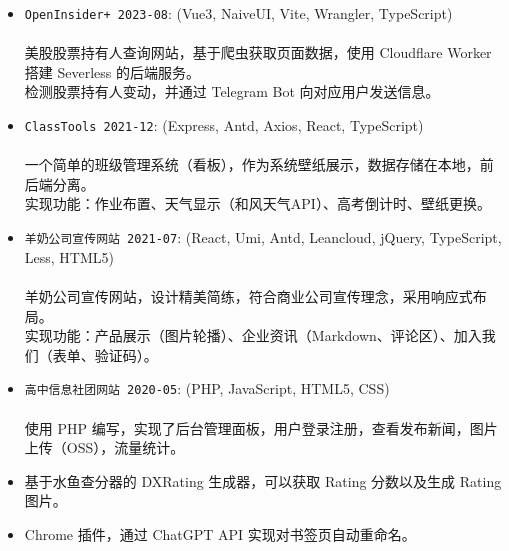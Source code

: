 \documentclass[zh]{resume}
\begin{document}
\begin{itemize}
  \item \texttt{OpenInsider+ 2023-08}:
    (Vue3, NaiveUI, Vite, Wrangler, TypeScript)\\
    \\
    美股股票持有人查询网站，基于爬虫获取页面数据，使用 Cloudflare Worker 搭建 Severless 的后端服务。\\
    检测股票持有人变动，并通过 Telegram Bot 向对应用户发送信息。
  \item \texttt{ClassTools 2021-12}:
    (Express, Antd, Axios, React, TypeScript)\\
    \\
    一个简单的班级管理系统（看板），作为系统壁纸展示，数据存储在本地，前后端分离。\\
    实现功能：作业布置、天气显示（和风天气API）、高考倒计时、壁纸更换。
  \item \texttt{羊奶公司宣传网站 2021-07}:
    (React, Umi, Antd, Leancloud, jQuery, TypeScript, Less, HTML5)\\
    \\
    羊奶公司宣传网站，设计精美简练，符合商业公司宣传理念，采用响应式布局。\\
    实现功能：产品展示（图片轮播）、企业资讯（Markdown、评论区）、加入我们（表单、验证码）。
  \item {\texttt{高中信息社团网站 2020-05}}:
    (PHP, JavaScript, HTML5, CSS)\\
    \\
    使用 PHP 编写，实现了后台管理面板，用户登录注册，查看发布新闻，图片上传（OSS），流量统计。
\end{itemize}

\begin{itemize}
  \item 基于水鱼查分器的 DXRating 生成器，可以获取 Rating 分数以及生成 Rating 图片。
  \item Chrome 插件，通过 ChatGPT API 实现对书签页自动重命名。
\end{itemize}
\end{document}
